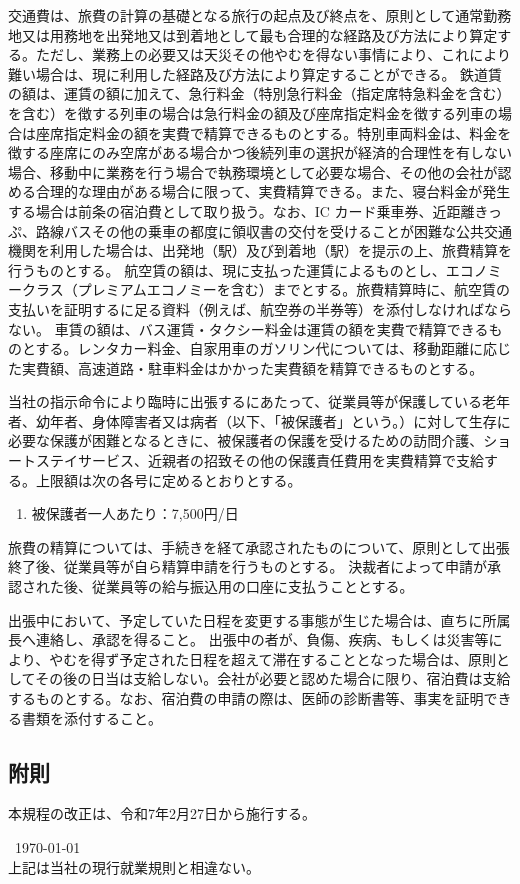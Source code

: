\documentclass[10pt,a4paper,uplatex]{jsarticle}
\begin{document}
交通費は、旅費の計算の基礎となる旅行の起点及び終点を、原則として通常勤務地又は用務地を出発地又は到着地として最も合理的な経路及び方法により算定する。ただし、業務上の必要又は天災その他やむを得ない事情により、これにより難い場合は、現に利用した経路及び方法により算定することができる。
\term 鉄道賃の額は、運賃の額に加えて、急行料金（特別急行料金（指定席特急料金を含む）を含む）を徴する列車の場合は急行料金の額及び座席指定料金を徴する列車の場合は座席指定料金の額を実費で精算できるものとする。特別車両料金は、料金を徴する座席にのみ空席がある場合かつ後続列車の選択が経済的合理性を有しない場合、移動中に業務を行う場合で執務環境として必要な場合、その他の会社が認める合理的な理由がある場合に限って、実費精算できる。また、寝台料金が発生する場合は前条の宿泊費として取り扱う。なお、IC カード乗車券、近距離きっぷ、路線バスその他の乗車の都度に領収書の交付を受けることが困難な公共交通機関を利用した場合は、出発地（駅）及び到着地（駅）を提示の上、旅費精算を行うものとする。
\term 航空賃の額は、現に支払った運賃によるものとし、エコノミークラス（プレミアムエコノミーを含む）までとする。旅費精算時に、航空賃の支払いを証明するに足る資料（例えば、航空券の半券等）を添付しなければならない。
\term 車賃の額は、バス運賃・タクシー料金は運賃の額を実費で精算できるものとする。レンタカー料金、自家用車のガソリン代については、移動距離に応じた実費額、高速道路・駐車料金はかかった実費額を精算できるものとする。

当社の指示命令により臨時に出張するにあたって、従業員等が保護している老年者、幼年者、身体障害者又は病者（以下、「被保護者」という。）に対して生存に必要な保護が困難となるときに、被保護者の保護を受けるための訪問介護、ショートステイサービス、近親者の招致その他の保護責任費用を実費精算で支給する。上限額は次の各号に定めるとおりとする。
\begin{enumerate}
    \item 被保護者一人あたり：7,500円/日
\end{enumerate}

旅費の精算については、手続きを経て承認されたものについて、原則として出張終了後、従業員等が自ら精算申請を行うものとする。
\term 決裁者によって申請が承認された後、従業員等の給与振込用の口座に支払うこととする。

出張中において、予定していた日程を変更する事態が生じた場合は、直ちに所属長へ連絡し、承認を得ること。
\term 出張中の者が、負傷、疾病、もしくは災害等により、やむを得ず予定された日程を超えて滞在することとなった場合は、原則としてその後の日当は支給しない。会社が必要と認めた場合に限り、宿泊費は支給するものとする。なお、宿泊費の申請の際は、医師の診断書等、事実を証明できる書類を添付すること。

\subsection*{附則}
本規程の改正は、令和7年2月27日から施行する。

\begin{flushleft}\
\today\\
\vspace{10pt}
上記は当社の現行就業規則と相違ない。\\
\vspace{10pt}
\MakeSignatureField
\end{flushleft}
\end{document}
